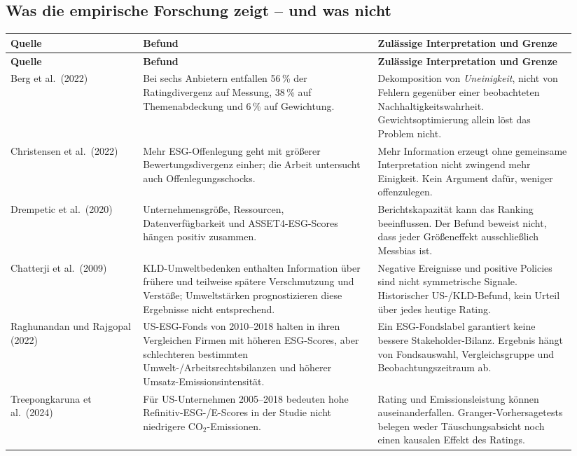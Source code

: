 \documentclass[11pt,a4paper]{article}
\begin{document}
\subsection{Was die empirische Forschung zeigt -- und was nicht}
\small
\begin{longtable}{@{}P{0.22\linewidth}P{0.39\linewidth}P{0.33\linewidth}@{}}
\toprule
\textbf{Quelle} & \textbf{Befund} & \textbf{Zulässige Interpretation und Grenze} \\
\midrule
\endfirsthead
\toprule
\textbf{Quelle} & \textbf{Befund} & \textbf{Zulässige Interpretation und Grenze} \\
\midrule
\endhead
Berg et al.\ (2022) \cite{berg2022} & Bei sechs Anbietern entfallen 56\,\% der Ratingdivergenz auf Messung, 38\,\% auf Themenabdeckung und 6\,\% auf Gewichtung. & Dekomposition von \emph{Uneinigkeit}, nicht von Fehlern gegenüber einer beobachteten Nachhaltigkeitswahrheit. Gewichtsoptimierung allein löst das Problem nicht. \\
Christensen et al.\ (2022) \cite{christensen2022} & Mehr ESG-Offenlegung geht mit größerer Bewertungsdivergenz einher; die Arbeit untersucht auch Offenlegungsschocks. & Mehr Information erzeugt ohne gemeinsame Interpretation nicht zwingend mehr Einigkeit. Kein Argument dafür, weniger offenzulegen. \\
Drempetic et al.\ (2020) \cite{drempetic2020} & Unternehmensgröße, Ressourcen, Datenverfügbarkeit und ASSET4-ESG-Scores hängen positiv zusammen. & Berichtskapazität kann das Ranking beeinflussen. Der Befund beweist nicht, dass jeder Größeneffekt ausschließlich Messbias ist. \\
Chatterji et al.\ (2009) \cite{chatterji2009} & KLD-Umweltbedenken enthalten Information über frühere und teilweise spätere Verschmutzung und Verstöße; Umweltstärken prognostizieren diese Ergebnisse nicht entsprechend. & Negative Ereignisse und positive Policies sind nicht symmetrische Signale. Historischer US-/KLD-Befund, kein Urteil über jedes heutige Rating. \\
Raghunandan und Rajgopal (2022) \cite{raghunandan2022} & US-ESG-Fonds von 2010--2018 halten in ihren Vergleichen Firmen mit höheren ESG-Scores, aber schlechteren bestimmten Umwelt-/Arbeitsrechtsbilanzen und höherer Umsatz-Emissionsintensität. & Ein ESG-Fondslabel garantiert keine bessere Stakeholder-Bilanz. Ergebnis hängt von Fondsauswahl, Vergleichsgruppe und Beobachtungszeitraum ab. \\
Treepongkaruna et al.\ (2024) \cite{treepongkaruna2024} & Für US-Unternehmen 2005--2018 bedeuten hohe Refinitiv-ESG-/E-Scores in der Studie nicht niedrigere CO$_2$-Emissionen. & Rating und Emissionsleistung können auseinanderfallen. Granger-Vorhersagetests belegen weder Täuschungsabsicht noch einen kausalen Effekt des Ratings. \\

\end{longtable}
\end{document}
